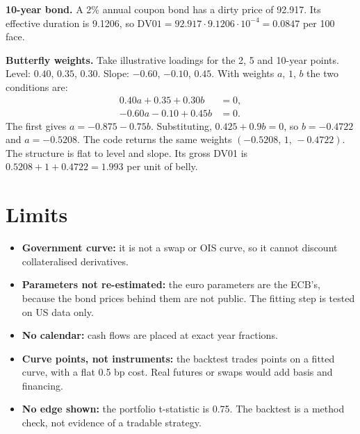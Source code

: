 \documentclass[11pt,a4paper]{article}
\begin{document}
\textbf{10-year bond.} A 2\% annual coupon bond has a dirty price of 92.917. Its effective duration is 9.1206, so $\text{DV01}=92.917\cdot9.1206\cdot10^{-4}=0.0847$ per 100 face.

\textbf{Butterfly weights.} Take illustrative loadings for the 2, 5 and 10-year points.
Level: $0.40$, $0.35$, $0.30$.
Slope: $-0.60$, $-0.10$, $0.45$.
With weights $a$, $1$, $b$ the two conditions are:
\begin{align*}
0.40a+0.35+0.30b&=0,\\
-0.60a-0.10+0.45b&=0.
\end{align*}
The first gives $a=-0.875-0.75b$. Substituting, $0.425+0.9b=0$, so $b=-0.4722$ and $a=-0.5208$. The code returns the same weights $(-0.5208,\,1,\,-0.4722)$. The structure is flat to level and slope. Its gross DV01 is $0.5208+1+0.4722=1.993$ per unit of belly.

\section{Limits}

\begin{itemize}
\item \textbf{Government curve:} it is not a swap or OIS curve, so it cannot discount collateralised derivatives.
\item \textbf{Parameters not re-estimated:} the euro parameters are the ECB's, because the bond prices behind them are not public. The fitting step is tested on US data only.
\item \textbf{No calendar:} cash flows are placed at exact year fractions.
\item \textbf{Curve points, not instruments:} the backtest trades points on a fitted curve, with a flat 0.5 bp cost. Real futures or swaps would add basis and financing.
\item \textbf{No edge shown:} the portfolio t-statistic is 0.75. The backtest is a method check, not evidence of a tradable strategy.
\end{itemize}
\end{document}
